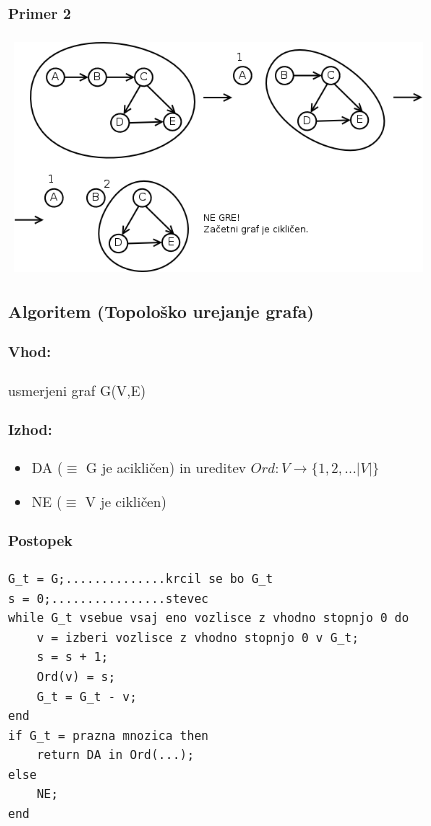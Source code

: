 \documentclass[a4paper,10pt]{article}
\begin{document}
\paragraph{Primer 2}
\begin{center}
	\includegraphics[width=11.15cm,height=6.1cm]{Slike/TopoloskoUrejanje7.png}
\end{center}

\subsubsection{Algoritem (Topolo\v sko urejanje grafa)}

\paragraph{Vhod:} usmerjeni graf G(V,E)

\paragraph{Izhod:}
\begin{itemize}
\item DA ($\equiv$ G je acikli\v cen) in ureditev $Ord: V \rightarrow \lbrace 1, 2,... \vert V \vert \rbrace$
\item NE ($\equiv$ V je cikli\v cen)
\end{itemize}

\paragraph{Postopek}
\begin{flushleft}
\begin{lstlisting}
G_t = G;..............krcil se bo G_t
s = 0;................stevec
while G_t vsebue vsaj eno vozlisce z vhodno stopnjo 0 do
	v = izberi vozlisce z vhodno stopnjo 0 v G_t;
	s = s + 1;
	Ord(v) = s;
	G_t = G_t - v;
end
if G_t = prazna mnozica then
	return DA in Ord(...);
else
	NE;
end
\end{lstlisting}
\end{flushleft}
\end{document}
